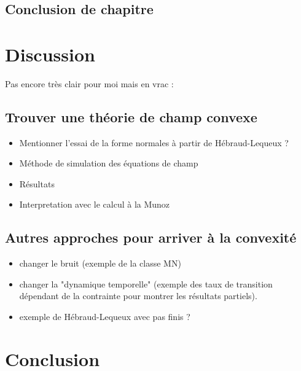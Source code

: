 \documentclass[10pt,a4paper]{article}
\begin{document}
\subsection{Conclusion de chapitre}

\section{Discussion}

Pas encore très clair pour moi mais en vrac :

\subsection{Trouver une théorie de champ convexe}

\begin{itemize}
	\item Mentionner l'essai de la forme normales à partir de Hébraud-Lequeux ?
	\item Méthode de simulation des équations de champ
	\item Résultats
	\item Interpretation avec le calcul à la Munoz
\end{itemize}

\subsection{Autres approches pour arriver à la convexité}

\begin{itemize}
	\item changer le bruit (exemple de la classe MN)
	\item changer la "dynamique temporelle" (exemple des taux de transition dépendant de la contrainte pour montrer les résultats partiels).
	\item exemple de Hébraud-Lequeux avec pas finis ?
\end{itemize}

\section{Conclusion}
\end{document}
